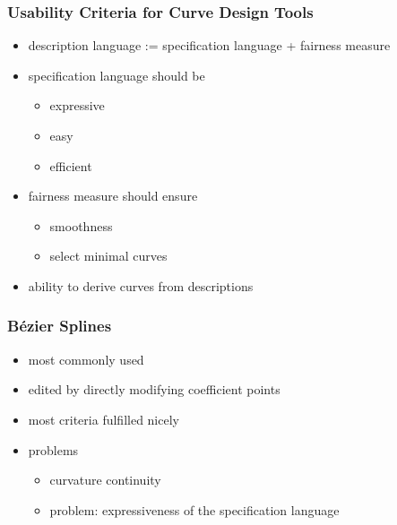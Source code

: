 \documentclass[mathserif]{beamer}
\begin{document}
		\begin{frame}
			\frametitle{Usability Criteria for Curve Design Tools}
			\begin{itemize}
				\item description language := specification language + fairness measure
				\item specification language should be
				\begin{itemize}
					\item expressive
					\item easy
					\item efficient
				\end{itemize}
				\item fairness measure should ensure
				\begin{itemize}
					\item smoothness
					\item select minimal curves
				\end{itemize}
				\item ability to derive curves from descriptions
			\end{itemize}
		\end{frame}

		\begin{frame}
			\frametitle{Bézier Splines}
			\begin{itemize}
				\item most commonly used
				\item edited by directly modifying coefficient points
				\item most criteria fulfilled nicely
				\item problems
				\begin{itemize}
					\item curvature continuity
					\item problem: expressiveness of the specification language
				\end{itemize}
			\end{itemize}
		\end{frame}
\end{document}
